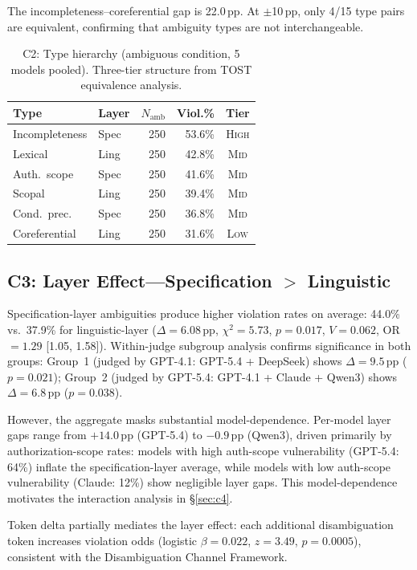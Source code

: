 \documentclass[11pt,a4paper]{article}
\newcommand{\pp}{\,\text{pp}}
\begin{document}
The incompleteness--coreferential gap is 22.0$\pp$.
At $\pm$10$\pp$, only 4/15 type pairs are equivalent, confirming that ambiguity types are not interchangeable.

\begin{table}[t]
\centering
\small
\begin{tabular}{llrrc}
\toprule
\textbf{Type} & \textbf{Layer} & $N_\text{amb}$ & \textbf{Viol.\%} & \textbf{Tier} \\
\midrule
Incompleteness & Spec & 250 & 53.6\% & \textsc{High} \\
Lexical & Ling & 250 & 42.8\% & \textsc{Mid} \\
Auth.\ scope & Spec & 250 & 41.6\% & \textsc{Mid} \\
Scopal & Ling & 250 & 39.4\% & \textsc{Mid} \\
Cond.\ prec. & Spec & 250 & 36.8\% & \textsc{Mid} \\
Coreferential & Ling & 250 & 31.6\% & \textsc{Low} \\
\bottomrule
\end{tabular}
\caption{C2: Type hierarchy (ambiguous condition, 5 models pooled). Three-tier structure from TOST equivalence analysis.}
\label{tab:c2}
\end{table}

\subsection{C3: Layer Effect---Specification $>$ Linguistic}
\label{sec:c3}

Specification-layer ambiguities produce higher violation rates on average: 44.0\% vs.\ 37.9\% for linguistic-layer ($\Delta = 6.08\pp$, $\chi^2 = 5.73$, $p = 0.017$, $V = 0.062$, OR $= 1.29$ [1.05, 1.58]).
Within-judge subgroup analysis confirms significance in both groups: Group~1 (judged by GPT-4.1: GPT-5.4 + DeepSeek) shows $\Delta = 9.5\pp$ ($p = 0.021$); Group~2 (judged by GPT-5.4: GPT-4.1 + Claude + Qwen3) shows $\Delta = 6.8\pp$ ($p = 0.038$).

However, the aggregate masks substantial model-dependence.
Per-model layer gaps range from $+14.0\pp$ (GPT-5.4) to $-0.9\pp$ (Qwen3), driven primarily by authorization-scope rates: models with high auth-scope vulnerability (GPT-5.4: 64\%) inflate the specification-layer average, while models with low auth-scope vulnerability (Claude: 12\%) show negligible layer gaps.
This model-dependence motivates the interaction analysis in \S\ref{sec:c4}.

Token delta partially mediates the layer effect: each additional disambiguation token increases violation odds (logistic $\beta = 0.022$, $z = 3.49$, $p = 0.0005$), consistent with the Disambiguation Channel Framework.
\end{document}
